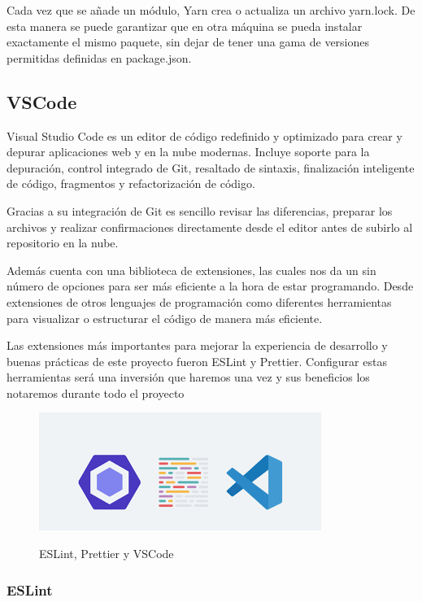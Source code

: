 \documentclass[12pt,twoside,titlepage]{report}
\begin{document}
Cada vez que se añade un módulo, Yarn crea o actualiza un archivo yarn.lock.
De esta manera se puede garantizar que en otra máquina se pueda instalar exactamente el mismo paquete, sin dejar de tener una gama de versiones permitidas definidas en package.json. 


\subsection{VSCode}

Visual Studio Code es un editor de código redefinido y optimizado para crear y depurar aplicaciones web y en la nube modernas. Incluye soporte para la depuración, control integrado de Git, resaltado de sintaxis, finalización inteligente de código, fragmentos y refactorización de código.

Gracias a su integración de Git es sencillo revisar las diferencias, preparar los archivos y realizar confirmaciones directamente desde el editor antes de subirlo al repositorio en la nube.

Además cuenta con una biblioteca de extensiones, las cuales nos da un sin número de opciones para ser más eficiente a la hora de estar programando. Desde extensiones de otros lenguajes de programación como diferentes herramientas para visualizar o estructurar el código de manera más eficiente.

Las extensiones más importantes para mejorar la experiencia de desarrollo y buenas prácticas de este proyecto fueron ESLint y Prettier. Configurar estas herramientas será una inversión que haremos una vez y sus beneficios los notaremos durante todo el proyecto

\begin{figure}[H]
    \centering
    \includegraphics[scale=0.8]{VSCode/VScodeExtensions}
    \label{fig:VScode_extensions}
    \caption{ESLint, Prettier y VSCode}
\end{figure}

\subsubsection{ESLint}
\end{document}
